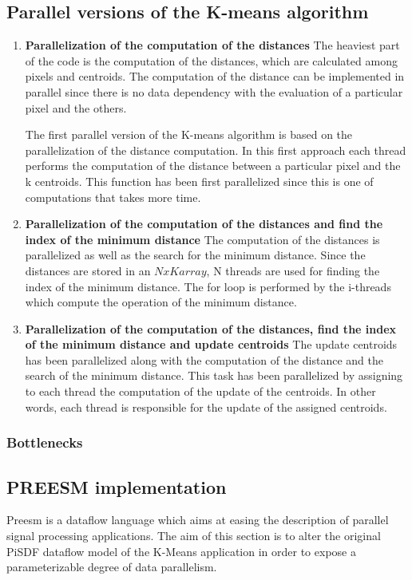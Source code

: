    \subsection{Parallel versions of the K-means algorithm}
\begin{enumerate}[label=\textbf{\arabic*})]
   \item \textbf {Parallelization of the computation of the distances} \newline
    The heaviest part of the code is the computation of the distances, which are calculated among pixels and centroids. The computation of the distance can be implemented in parallel since there is no data dependency with the evaluation of a particular pixel and the others.
   
   The first parallel version of the K-means algorithm is based on the parallelization of the distance computation. In this first approach each thread performs the computation of the distance between a particular pixel and the k centroids. This function has been first parallelized since this is one of computations that takes more time.

 \item \textbf {Parallelization of the computation of the distances and find the index of the minimum distance} \newline
   The computation of the distances is parallelized as well as the search for the minimum distance. Since the distances are stored in an $NxK array$, N threads are used for finding the index of the minimum distance. The for loop is performed by the i-threads which compute the operation of the minimum distance. 

\item \textbf{Parallelization of the computation of the distances, find the index of the minimum distance and update centroids} \newline
  The update centroids has been parallelized along with the computation of the distance and the search of the minimum distance. This task has been parallelized by assigning to each thread the computation of the update of the centroids. In other words, each thread is responsible for the update of the assigned centroids.
\end{enumerate}   
   

     	\subsubsection{Bottlenecks}
     	
        \subsection{PREESM implementation}
   Preesm is a dataflow language which aims at easing the description of parallel signal processing applications.
   The aim of this section is to alter the original PiSDF dataflow model of the K-Means application in order to expose a parameterizable degree of data parallelism.
   
